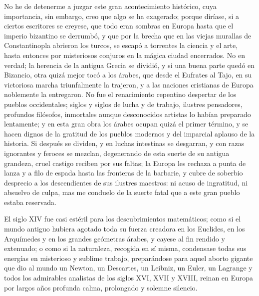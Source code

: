\documentclass[a4paper, 12pt]{article}
\begin{document}
No he de detenerme a juzgar este gran acontecimiento histórico, cuya importancia, sin embargo, creo que algo se ha exagerado; porque diríase, si a ciertos escritores se creyese, que todo eran sombras en Europa hasta que el imperio bizantino se derrumbó, y que por la brecha que en las viejas murallas de Constantinopla abrieron los turcos, se escapó a torrentes la ciencia y el arte, hasta entonces por misteriosos conjuros en la mágica ciudad encerrados.  No en verdad; la herencia de la antigua Grecia se dividió, y si una buena parte quedó en Bizancio, otra quizá mejor tocó a los árabes, que desde el Eufrates al Tajo, en su victoriosa marcha triunfalmente la trajeron, y a las naciones cristianas de Europa noblemente la entregaron.  No fue el renacimiento repentino despertar de los pueblos occidentales; siglos y siglos de lucha y de trabajo, ilustres pensadores, profundos filósofos, inmortales aunque desconocidos artistas lo habían preparado lentamente; y en esta gran obra los árabes ocupan quizá el primer término, y se hacen dignos de la gratitud de los pueblos modernos y del imparcial aplauso de la historia.  Si después se dividen, y en luchas intestinas se desgarran, y con razas ignorantes y feroces se mezclan, degenerando de esta suerte de su antigua grandeza, cruel castigo reciben por sus faltas; la Europa les rechaza a punta de lanza y a filo de espada hasta las fronteras de la barbarie, y cubre de soberbio desprecio a los descendientes de sus ilustres maestros: ni acuso de ingratitud, ni absuelvo de culpa, mas me conduelo de la suerte fatal que a este gran pueblo estaba reservada.

El siglo XIV fue casi estéril para los descubrimientos matemáticos; como si el mundo antiguo hubiera agotado toda su fuerza creadora en los Euclides, en los Arquímedes y en los grandes geómetras árabes, y cayese al fin rendido y extenuado; o como si la naturaleza, recogida en sí misma, condensase todas sus energías en misterioso y sublime trabajo, preparándose para aquel aborto gigante que dio al mundo un Newton, un Descartes, un Leibniz, un Euler, un Lagrange y todos los admirables analistas de los siglos XVI, XVII y XVIII, reinan en Europa por largos años profunda calma, prolongado y solemne silencio.
\end{document}

